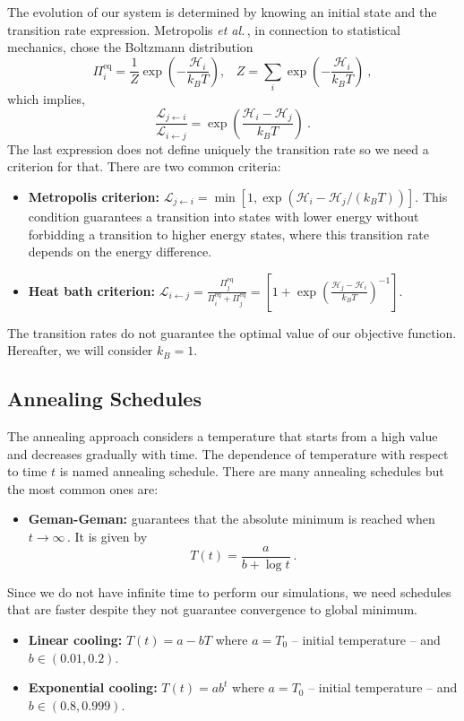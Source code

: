 The evolution of our system is determined by knowing an initial state and the transition rate expression. Metropolis \textit{et al.}\,\cite{Metropolis1953}, in connection to statistical mechanics, chose the Boltzmann distribution
\begin{equation}
    \Pi_{i}^{\mathrm{eq}} = \frac{1}{Z}\exp\left(- \frac{\mathcal{H}_{i}}{k_{B}T}\right), \;\;\; Z = \sum_{i}\exp\left(-\frac{\mathcal{H}_{i}}{k_{B}T}\right)\ ,
\end{equation}
which implies,
\begin{equation}
    \frac{\mathcal{L}_{j \leftarrow i}}{\mathcal{L}_{i \leftarrow j}} = \exp\left(\frac{\mathcal{H}_{i} - \mathcal{H}_{j}}{k_{B}T}\right)\ .
\end{equation}
The last expression does not define uniquely the transition rate so we need a criterion for that. There are two common criteria:
\begin{itemize}
    \item\textbf{Metropolis criterion:} $\mathcal{L}_{j \leftarrow i} = \min \left[1,\exp\left(\mathcal{H}_{i}-\mathcal{H}_{j}/\left(k_{B}T\right)\right)\right]$. This condition guarantees a transition into states with lower energy without forbidding a transition to higher energy states, where this transition rate depends on the energy difference. 
    \item \textbf{Heat bath criterion:} $\mathcal{L}_{i \leftarrow j} = \frac{\Pi_{j}^{\mathrm{eq}}}{\Pi_{i}^{\mathrm{eq}} + \Pi_{j}^{\mathrm{eq}}} = \left[1 + \exp\left(\frac{\mathcal{H}_{j}- \mathcal{H}_{i}}{k_{B}T}\right)^{-1}\right]$. 
\end{itemize}
 The transition rates do not guarantee the optimal value of our objective function. Hereafter, we will consider $k_B = 1$.
\subsection{Annealing Schedules}
The annealing approach considers a temperature that starts from a high value and decreases gradually with time. The dependence of temperature with respect to time $t$ is named annealing schedule. There are many annealing schedules but the most common ones are:
\begin{itemize}
    \item \textbf{Geman-Geman:} guarantees that the absolute minimum is reached when $t\to\infty$\,\cite{Geman1984StochasticImages}. It is given by
    \begin{equation}
        T(t) = \frac{a}{b + \log{t}}\ .
    \end{equation}
\end{itemize}
Since we do not have infinite time to perform our simulations, we need schedules that are faster despite they not guarantee convergence to global minimum. 
\begin{itemize}
    \item \textbf{Linear cooling:} $T(t) = a - bT$ where $a = T_{0}$ -- initial temperature -- and $b \in (0.01,0.2)$.
    \item \textbf{Exponential cooling:} $T(t) = ab^{t}$ where $a = T_{0}$ -- initial temperature -- and $b \in (0.8,0.999)$.
\end{itemize}

